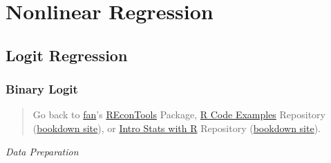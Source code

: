 \documentclass[
]{book}
\begin{document}
\hypertarget{nonlinear-regression}{%
\chapter{Nonlinear Regression}\label{nonlinear-regression}}

\hypertarget{logit-regression}{%
\section{Logit Regression}\label{logit-regression}}

\hypertarget{binary-logit}{%
\subsection{Binary Logit}\label{binary-logit}}

\begin{quote}
Go back to \href{http://fanwangecon.github.io/}{fan}'s \href{https://fanwangecon.github.io/REconTools/}{REconTools} Package, \href{https://fanwangecon.github.io/R4Econ/}{R Code Examples} Repository (\href{https://fanwangecon.github.io/R4Econ/bookdown}{bookdown site}), or \href{https://fanwangecon.github.io/Stat4Econ/}{Intro Stats with R} Repository (\href{https://fanwangecon.github.io/Stat4Econ/bookdown}{bookdown site}).
\end{quote}

\emph{Data Preparation}
\end{document}
